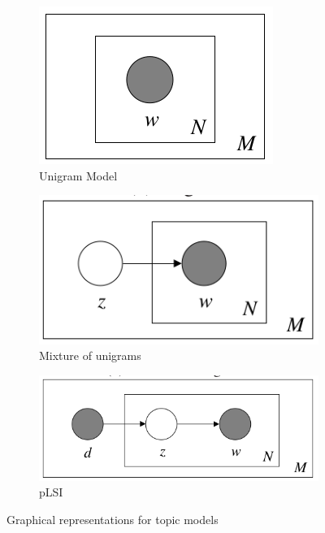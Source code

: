 \documentclass{article}
\begin{document}
\begin{figure}
    \centering
    \begin{subfigure}[b]{0.3\textwidth}
        \includegraphics[width=\textwidth]{unigram}
        \caption{Unigram Model}
        \label{fig:uni}
    \end{subfigure}
    \begin{subfigure}[b]{0.3\textwidth}
        \includegraphics[width=\textwidth]{mixunigram}
        \caption{Mixture of unigrams}
        \label{fig:mix}
    \end{subfigure}
    \begin{subfigure}[b]{0.3\textwidth}
        \includegraphics[width=\textwidth]{plsi}
        \caption{pLSI}
        \label{fig:plsi}
    \end{subfigure}
    \caption{Graphical representations for topic models}
\end{figure}
\end{document}
